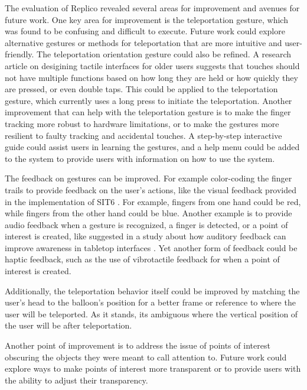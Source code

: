     The evaluation of Replico revealed several areas for improvement and avenues for future work. One key area for improvement is the teleportation gesture, which was found to be confusing and difficult to execute. Future work could explore alternative gestures or methods for teleportation that are more intuitive and user-friendly. The teleportation orientation gesture could also be refined. A research article on desigining tactile interfaces for older users \cite{elderly} suggests that touches should not have multiple functions based on how long they are held or how quickly they are pressed, or even double taps. This could be applied to the teleportation gesture, which currently uses a long press to initiate the teleportation. Another improvement that can help with the teleportation gesture is to make the finger tracking more robust to hardware limitations, or to make the gestures more resilient to faulty tracking and accidental touches. A step-by-step interactive guide could assist users in learning the gestures, and a help menu could be added to the system to provide users with information on how to use the system.
    
    The feedback on gestures can be improved. For example color-coding the finger trails to provide feedback on the user's actions, like the visual feedback provided in the implementation of SIT6 \cite{almeidaSIT6IndirectTouchbased2023}. For example, fingers from one hand could be red, while fingers from the other hand could be blue. Another example is to provide audio feedback when a gesture is recognized, a finger is detected, or a point of interest is created, like suggested in a study about how auditory feedback can improve awareness in tabletop interfaces \cite{auditoryAwareness}. Yet another form of feedback could be haptic feedback, such as the use of vibrotactile feedback for when a point of interest is created.

    Additionally, the teleportation behavior itself could be improved by matching the user's head to the balloon's position for a better frame or reference to where the user will be teleported. As it stands, its ambiguous where the vertical position of the user will be after teleportation.

    Another point of improvement is to address the issue of points of interest obscuring the objects they were meant to call attention to. Future work could explore ways to make points of interest more transparent or to provide users with the ability to adjust their transparency.

